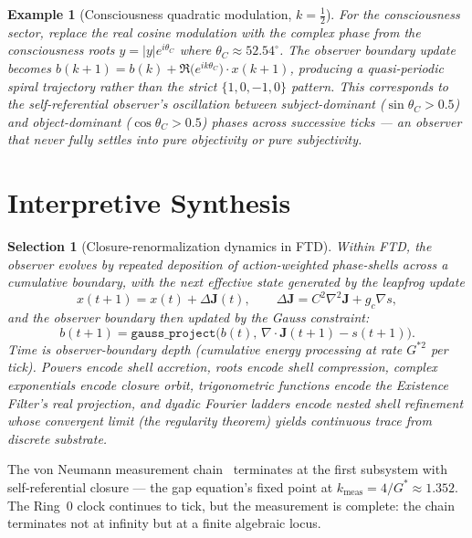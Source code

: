 \documentclass[11pt]{article}
\theoremstyle{tight}
\theoremstyle{plainroman}
\newtheorem{selection}[theorem]{Selection}
\newtheorem{example}[theorem]{Example}
\begin{document}
\begin{example}[Consciousness quadratic modulation, $k=\tfrac12$]
For the consciousness sector, replace the real cosine modulation with the complex phase from the consciousness roots $y=|y|e^{i\theta_C}$ where $\theta_C\approx 52.54^\circ$.
The observer boundary update becomes $b(k+1)=b(k)+\Re\!\bigl(e^{ik\theta_C}\bigr)\cdot x(k+1)$, producing a quasi-periodic spiral trajectory rather than the strict $\{1,0,-1,0\}$ pattern.
This corresponds to the self-referential observer's oscillation between subject-dominant ($\sin\theta_C>0.5$) and object-dominant ($\cos\theta_C>0.5$) phases across successive ticks --- an observer that never fully settles into pure objectivity or pure subjectivity.
\end{example}

\section{Interpretive Synthesis}

\begin{selection}[Closure-renormalization dynamics in FTD]
Within FTD, the observer evolves by repeated deposition of action-weighted phase-shells across a cumulative boundary, with the next effective state generated by the leapfrog update
\[
x(t{+}1)=x(t)+\Delta\mathbf J(t), \qquad \Delta\mathbf J=C^2\nabla^2\mathbf J+g_c\nabla s,
\]
and the observer boundary then updated by the Gauss constraint:
\[
b(t{+}1)=\texttt{gauss\_project}\bigl(b(t),\,\nabla\!\cdot\!\mathbf J(t{+}1)-s(t{+}1)\bigr).
\]
Time is observer-boundary depth (cumulative energy processing at rate $G^{*2}$ per tick).
Powers encode shell accretion, roots encode shell compression, complex exponentials encode closure orbit, trigonometric functions encode the Existence Filter's real projection, and dyadic Fourier ladders encode nested shell refinement whose convergent limit (the regularity theorem) yields continuous trace from discrete substrate.
\end{selection}

The von Neumann measurement chain~\cite{ftdvnc} terminates at the first subsystem with self-referential closure --- the gap equation's fixed point at $k_{\text{meas}}=4/G^*\approx 1.352$.
The Ring~0 clock continues to tick, but the measurement is complete: the chain terminates not at infinity but at a finite algebraic locus.
\end{document}
